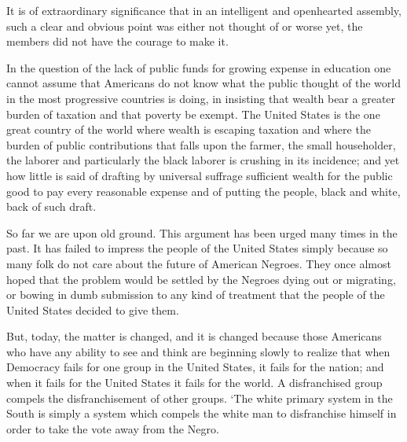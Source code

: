 \documentclass[letterpaper,10pt,english]{jupyterBook}
\begin{document}
\sphinxAtStartPar
It is of extraordinary significance that in an intelligent and open\sphinxhyphen{}hearted assembly, such a clear and obvious point was either not thought of or worse yet, the members did not have the courage to make it.

\sphinxAtStartPar
In the question of the lack of public funds for growing expense in education one cannot assume that Americans do not know what the public thought of the world in the most progressive countries is doing, in insisting that wealth bear a greater burden of taxation and that poverty be exempt. The United States is the one great country of the world where wealth is escaping taxation and where the burden of public contributions that falls upon the farmer, the small householder, the laborer and particularly the black laborer is crushing in its incidence; and yet how little is said of drafting by universal suffrage sufficient wealth for the public good to pay every reasonable expense and of putting the people, black and white, back of such draft.

\sphinxAtStartPar
{}

\sphinxAtStartPar
So far we are upon old ground. This argument has been urged many times in the past. It has failed to impress the people of the United States simply because so many folk do not care about the future of American Negroes. They once almost hoped that the problem would be settled by the Negroes dying out or migrating, or bowing in dumb submission to any kind of treatment that the people of the United States decided to give them.

\sphinxAtStartPar
But, today, the matter is changed, and it is changed because those Americans who have any ability to see and think are beginning slowly to realize that when Democracy fails for one group in the United States, it fails for the nation; and when it fails for the United States it fails for the world. A disfranchised group compels the disfranchisement of other groups. ‘The white primary system in the South is simply a system which compels the white man to disfranchise himself in order to take the vote away from the Negro.
\end{document}
